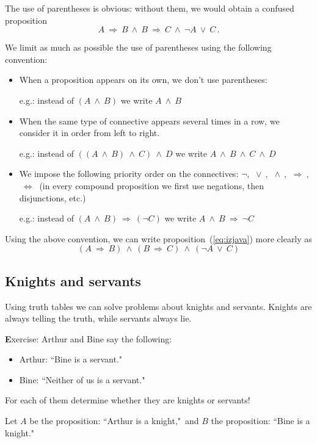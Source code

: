 \documentclass[11pt,paper=b5,footinclude,headinclude]{scrbook} %
\def\ali {{~\vee~}}
\def\inn {{~\wedge~}}
\def\sledi {{~\Rightarrow~}}
\def\cee {{~\Leftrightarrow~}}
\theoremstyle{remark}
\theoremstyle{definition} %
\begin{document}
The use of parentheses is obvious: without them, we would obtain a confused proposition
$$A \sledi B \inn B\sledi C \inn \neg A \ali C\,.$$

We limit as much as possible the use of parentheses using the following convention:
\begin{itemize}
	\item When a proposition appears on its own, we don't use parentheses:
	
	e.g.: instead of $(A\inn B)$ we write $A\inn B$
	
	\item When the same type of connective appears several times in a row, we consider it in order from left to right.
	
	e.g.: instead of $((A\inn B) \inn C) \inn D$ we write $A\inn B \inn C\inn D$
	
	\item We impose the following priority order on the connectives:
	$\neg$, $\ali$, $\inn$, $\sledi$, $\cee$ (in every compound proposition we first use negations, then disjunctions, etc.)
	
	e.g.: instead of $(A\inn B) \sledi (\neg C)$ we write  $A\inn B \sledi\neg C$
\end{itemize}

Using the above convention, we can write proposition~(\ref{eq:izjava}) more clearly as
\begin{equation}\label{eq:izjava2}
(A \sledi B) \inn (B\sledi C) \inn  (\neg A \ali C)
\end{equation}



\subsection*{Knights and servants}

Using truth tables we can solve problems about knights and servants.
Knights are always telling the truth, while servants always lie.

{\textbf Exercise:}
Arthur and Bine say the following:
\begin{itemize}
  \item Arthur: ``Bine is a servant."
  \item Bine: ``Neither of us is a servant."
\end{itemize}
For each of them determine whether they are knights or servants!

\medskip
Let $A$ be the proposition: ``Arthur is a knight,"~and $B$ the proposition: ``Bine is a knight."
\end{document}
